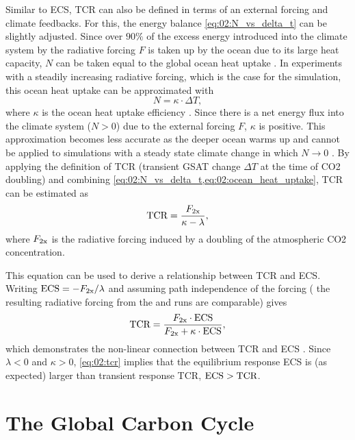 Similar to \ac{ECS}, \ac{TCR} can also be defined in terms of an external
forcing and climate feedbacks. For this, the energy balance
\cref{eq:02:N_vs_delta_t} can be slightly adjusted. Since over $90 \unit{\%}$
of the excess energy introduced into the climate system by the radiative
forcing $F$ is taken up by the ocean due to its large heat capacity, $N$ can be
taken equal to the global ocean heat uptake \autocite{Knutti2017}. In
experiments with a steadily increasing radiative forcing, which is the case for
the \onepctcotwo{} simulation, this ocean heat uptake can be approximated with
\begin{equation}
  N = \kappa \cdot \Delta T,
  \label{eq:02:ocean_heat_uptake}
\end{equation}
where $\kappa$ is the ocean heat uptake efficiency \autocite{Gregory2008}.
Since there is a net energy flux into the climate system ($N > 0$) due to the
external forcing $F$, $\kappa$ is positive. This approximation becomes less
accurate as the deeper ocean warms up and cannot be applied to simulations with
a steady state climate change in which $N \to 0$ \autocite{Gregory2009}. By
applying the definition of \ac{TCR} (transient \ac{GSAT} change $\Delta T$ at
the time of \ac{CO2} doubling) and combining
\cref{eq:02:N_vs_delta_t,eq:02:ocean_heat_uptake}, \ac{TCR} can be estimated as
\begin{equation}
  \textnormal{TCR} = \frac{F_{\textnormal{2x}}}{\kappa - \lambda},
  \label{eq:02:tcr}
\end{equation}
where $F_{\textnormal{2x}}$ is the radiative forcing induced by a doubling of the
atmospheric \ac{CO2} concentration.

This equation can be used to derive a relationship between \ac{TCR} and
\ac{ECS}. Writing $\textnormal{ECS} = -F_{\textnormal{2x}} / \lambda$ and assuming path
independence of the forcing (\ie{} the resulting radiative forcing from the
\onepctcotwo{} and  runs are comparable) gives
\begin{equation}
  \textnormal{TCR} = \frac{F_{\textnormal{2x}} \cdot \textnormal{ECS}}{F_{\textnormal{2x}} +
    \kappa \cdot \textnormal{ECS}},
  \label{eq:02:tcr_vs_ecs}
\end{equation}
which demonstrates the non-linear connection between \ac{TCR} and \ac{ECS}
\autocite{Gregory2008, Nijsse2020}. Since $\lambda < 0$ and $\kappa > 0$,
\cref{eq:02:tcr} implies that the equilibrium response \ac{ECS} is (as
expected) larger than transient response \ac{TCR}, \ie{} $\textnormal{ECS} >
\textnormal{TCR}$.


\section{The Global Carbon Cycle}
\label{sec:02:carbon_cycle}


